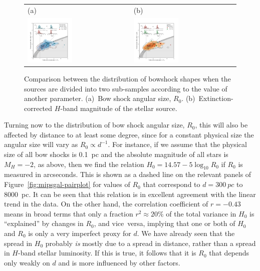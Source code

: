 \begin{figure}
  \centering
  \begin{tabular}{ll}
    (a) & (b) \\
    \includegraphics[width=0.45\textwidth]{figs/mipsgal-Rc-R90-R0} &
    \includegraphics[width=0.45\textwidth]{figs/mipsgal-Rc-R90-Mag} 
  \end{tabular}
  \caption[]{Comparison between the distribution of bowshock shapes
    when the sources are divided into two sub-samples according to the
    value of another parameter. (a)~Bow shock angular size, \(R_0\).
    (b)~Extinction-corrected \(H\)-band magnitude of the stellar
    source.}
  \label{fig:mipsgal-correlated}
\end{figure}

Turning now to the distribution of bow shock angular size, \(R_0\),
this will also be affected by distance to at least some degree, since
for a constant physical size the angular size will vary as
\(R_0 \propto d^{-1}\).  For instance, if we assume that the physical size
of all bow shocks is \SI{0.1}{pc} and the absolute magnitude of all
stars is \(M_H = -2\), as above, then we find the relation
\(H_0 = 14.57 - 5 \log_{10} R_0\) if \(R_0\) is measured in
arcseconds. This is shown as a dashed line on the relevant panels of
Figure~\ref{fig:mipsgal-pairplot} for values of \(R_0\) that
correspond to \(d = \SI{300}{pc}\) to \SI{8000}{pc}.  It can be seen
that this relation is in excellent agreement with the linear trend in
the data. On the other hand, the correlation coefficient of
\(r = -0.43\) means in broad terms that only a fraction
\(r^2 \approx 20\%\) of the total variance in \(H_0\) is ``explained'' by
changes in \(R_0\), and vice~versa, implying that one or both of
\(H_0\) and \(R_0\) is only a very imperfect proxy for \(d\).  We have
already seen that the spread in \(H_0\) probably \emph{is} mostly due
to a spread in distance, rather than a spread in \(H\)-band stellar
luminosity.  If this is true, it follows that it is \(R_0\) that
depends only weakly on \(d\) and is more influenced by other factors.
  
